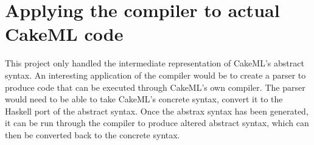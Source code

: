 \section{Applying the compiler to actual CakeML code}
This project only handled the intermediate representation of CakeML's abstract
syntax. An interesting application of the compiler would be to create a parser
to produce code that can be executed through CakeML's own compiler. The parser
would need to be able to take CakeML's concrete syntax, convert it to the
Haskell port of the abstract syntax. Once the abstrax syntax has been generated,
it can be run through the compiler to produce altered abstract syntax, which
can then be converted back to the concrete syntax.


